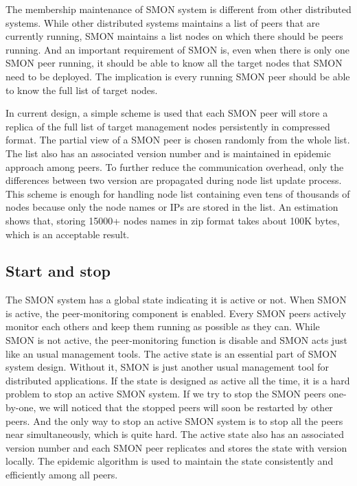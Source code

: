 The membership maintenance of SMON system is different from other
distributed systems. While other distributed systems maintains a
list of peers that are currently running, SMON maintains a list
nodes on which there should be peers running.  And an important
requirement of SMON is, even when there is only one SMON peer
running, it should be able to know all the target nodes that SMON
need to be deployed. The implication is every running SMON peer
should be able to know the full list of target nodes.

In current design, a simple scheme is used that each SMON peer
will store a replica of the full list of target management nodes
persistently in compressed format. The partial view of a SMON
peer is chosen randomly from the whole list. The list also has
an associated version number and is maintained in epidemic
approach among peers. To further reduce the communication
overhead, only the differences between two version are
propagated during node list update process. This scheme is
enough for handling node list containing even tens of thousands
of nodes because only the node names or IPs are stored in the
list.  An estimation shows that, storing 15000+ nodes names in
zip format takes about 100K bytes, which is an acceptable
result.

\subsection{Start and stop}

The SMON system has a global state indicating it is active or
not. When SMON is active, the peer-monitoring component is
enabled. Every SMON peers actively monitor each others and keep
them running as possible as they can. While SMON is not active,
the peer-monitoring function is disable and SMON acts just like
an usual management tools. The active state is an essential part
of SMON system design. Without it, SMON is just another usual
management tool for distributed applications. If the state is
designed as active all the time, it is a hard problem to stop an
active SMON system. If we try to stop the SMON peers one-by-one,
we will noticed that the stopped peers will soon be restarted by
other peers. And the only way to stop an active SMON system is to
stop all the peers near simultaneously, which is quite hard.
The active state also has an associated version number and
each SMON peer replicates and stores the state with version locally.
The epidemic algorithm is used to maintain the state consistently
and efficiently among all peers.

